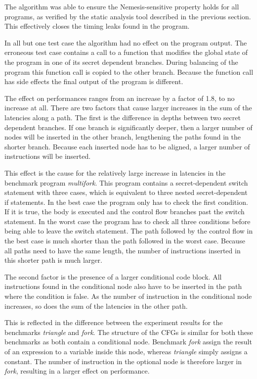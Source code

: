 The algorithm was able to ensure the Nemesis-sensitive property holds for all programs, as verified by the static analysis tool described in the previous section. This effectively closes the 
timing leaks found in the program. 

In all but one test case the algorithm had no effect on the program output. 
The erroneous test case contains a call to a function that modifies the global state of the program in one of its secret dependent branches. 
During balancing of the program this function call is copied to the other branch. 
Because the function call has side effects the final output of the program is different. 

The effect on performances ranges from an increase by a factor of 1.8, to no increase at all. 
There are two factors that cause larger increases in the sum of the latencies along a path. The first is the difference in depths between two secret dependent branches. 
If one branch is significantly deeper, then a larger number of nodes will be inserted in the other branch, lengthening the paths found in the shorter branch. 
Because each inserted node has to be aligned, a larger number of instructions will be inserted. 

This effect is the cause for the relatively large increase in latencies in the benchmark  program \textit{multifork}. 
This program contains a secret-dependent switch statement with three cases, which is equivalent to three nested secret-dependent if statements. 
In the best case the program only has to check the first condition. If it is true, the body is executed and the control flow branches past the switch statement. 
In the worst case the program has to check all three conditions before being able to leave the switch statement. 
The path followed by the control flow in the best case is much shorter than the path followed in the worst case. 
Because all paths need to have the same length, the number of instructions inserted in this shorter path is much larger. 

The second factor is the presence of a larger conditional code block. All instructions found in the conditional node also have to be inserted in the path where the condition is false. 
As the number of instruction in the conditional node increases, so does the sum of the latencies in the other path.

This is reflected in the difference between the experiment results for the benchmarks \textit{triangle} and \textit{fork}. The structure of the CFGs is similar for both these benchmarks as both contain a conditional node.
Benchmark \textit{fork} assign the result of an expression to a variable inside this node, whereas \textit{triangle} simply assigns a constant. The number of instruction in the optional node is therefore larger in \textit{fork}, resulting 
in a larger effect on performance.

